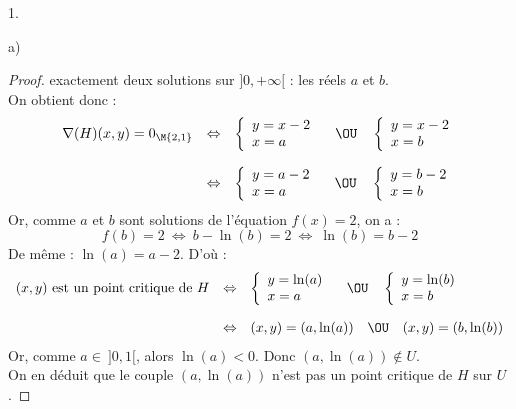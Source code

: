 \documentclass[11pt]{article}%
\begin{document}
\begin{noliste}{1.}
\begin{noliste}{a)}
\begin{proof}
      exactement deux solutions sur $]0,+\infty[$ : les réels
      $a$ et $b$.\\
      On obtient donc :
      \[
       \begin{array}{rcl}
        \nabla(H)(x,y)=0_{\M{2,1}} & \Leftrightarrow &
        \left\{
        \begin{array}{l}
          y = x-2\\
          x = a
        \end{array}
        \right.
        \quad \OU \quad 
        \left\{
        \begin{array}{l}
          y = x-2\\
          x = b
        \end{array}
        \right.
        \\[.6cm]
        & \Leftrightarrow &
        \left\{
        \begin{array}{l}
          y = a-2\\
          x = a
        \end{array}
        \right.
        \quad \OU \quad 
        \left\{
        \begin{array}{l}
          y = b-2\\
          x = b
        \end{array}
        \right.
       \end{array}
      \]
      Or, comme $a$ et $b$ sont solutions de l'équation $f(x)=2$, on a :
      \[
        f(b)=2 \ \Leftrightarrow \ b-\ln(b)=2 \ \Leftrightarrow \
        \ln(b)=b-2
      \]
      De même : $\ln(a)=a-2$. D'où :
      \[
       \begin{array}{rcl}
        \text{$(x,y)$ est un point critique de $H$} & \Leftrightarrow &
        \left\{
        \begin{array}{l}
          y = \ln(a)\\
          x = a
        \end{array}
        \right.
        \quad \OU \quad 
        \left\{
        \begin{array}{l}
          y = \ln(b)\\
          x = b
        \end{array}
        \right.
        \\[.6cm]
        & \Leftrightarrow & 
        (x,y)=(a,\ln(a)) \quad \OU \quad (x,y)=(b,\ln(b))
       \end{array}
      \]
      Or, comme $a \in \ ]0,1[$, alors $\ln(a) <0$. Donc 
      $(a, \ln(a)) \notin U$.\\
      On en déduit que le couple $(a,\ln(a))$ n'est pas un point 
      critique de $H$ sur $U$.
      

\end{proof}
\end{noliste}
\end{noliste}
\end{document}
